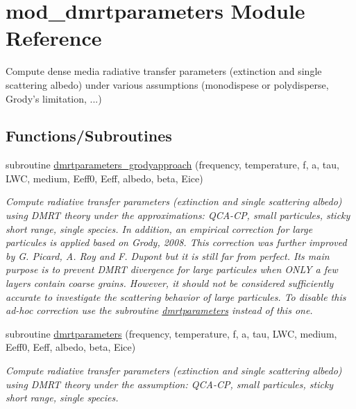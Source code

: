 \hypertarget{namespacemod__dmrtparameters}{
\section{mod\_\-dmrtparameters Module Reference}
\label{namespacemod__dmrtparameters}
}


Compute dense media radiative transfer parameters (extinction and single scattering albedo) under various assumptions (monodispese or polydisperse, Grody's limitation, ...)  


\subsection*{Functions/Subroutines}
\begin{DoxyCompactItemize}
\item 
subroutine \hyperlink{namespacemod__dmrtparameters_ad68751ad5720992b98c706938b0e5212}{dmrtparameters\_\-grodyapproach} (frequency, temperature, f, a, tau, LWC, medium, Eeff0, Eeff, albedo, beta, Eice)
\begin{DoxyCompactList}\small\item\em Compute radiative transfer parameters (extinction and single scattering albedo) using DMRT theory under the approximations: QCA-\/CP, small particules, sticky short range, single species. In addition, an empirical correction for large particules is applied based on Grody, 2008. This correction was further improved by G. Picard, A. Roy and F. Dupont but it is still far from perfect. Its main purpose is to prevent DMRT divergence for large particules when ONLY a few layers contain coarse grains. However, it should not be considered sufficiently accurate to investigate the scattering behavior of large particules. To disable this ad-\/hoc correction use the subroutine \hyperlink{namespacemod__dmrtparameters_a6b53a3c6747b54ec3317a31550177a9c}{dmrtparameters} instead of this one. \end{DoxyCompactList}\item 
subroutine \hyperlink{namespacemod__dmrtparameters_a6b53a3c6747b54ec3317a31550177a9c}{dmrtparameters} (frequency, temperature, f, a, tau, LWC, medium, Eeff0, Eeff, albedo, beta, Eice)
\begin{DoxyCompactList}\small\item\em Compute radiative transfer parameters (extinction and single scattering albedo) using DMRT theory under the assumption: QCA-\/CP, small particules, sticky short range, single species. \end{DoxyCompactList}\item 

\end{DoxyCompactItemize}
